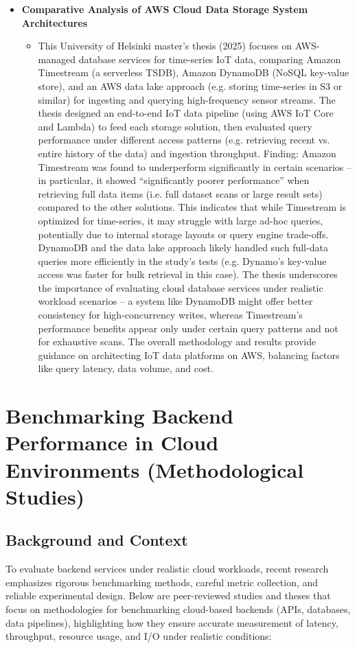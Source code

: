 \documentclass[11pt]{article}
\begin{document}
\begin{itemize}
\begin{itemize}
    \end{itemize}
    \item[] \textbf{Comparative Analysis of AWS Cloud Data Storage System Architectures} 
    \begin{itemize}
        \item[]  This University of Helsinki master’s thesis (2025) focuses on AWS-managed database services for time-series IoT data, comparing Amazon Timestream (a serverless TSDB), Amazon DynamoDB (NoSQL key-value store), and an AWS data lake approach (e.g. storing time-series in S3 or similar) for ingesting and querying high-frequency sensor streams. The thesis designed an end-to-end IoT data pipeline (using AWS IoT Core and Lambda) to feed each storage solution, then evaluated query performance under different access patterns (e.g. retrieving recent vs. entire history of the data) and ingestion throughput. Finding: Amazon Timestream was found to underperform significantly in certain scenarios – in particular, it showed “significantly poorer performance” when retrieving full data items (i.e. full dataset scans or large result sets) compared to the other solutions. This indicates that while Timestream is optimized for time-series, it may struggle with large ad-hoc queries, potentially due to internal storage layouts or query engine trade-offs. DynamoDB and the data lake approach likely handled such full-data queries more efficiently in the study’s tests (e.g. Dynamo’s key-value access was faster for bulk retrieval in this case). The thesis underscores the importance of evaluating cloud database services under realistic workload scenarios – a system like DynamoDB might offer better consistency for high-concurrency writes, whereas Timestream’s performance benefits appear only under certain query patterns and not for exhaustive scans. The overall methodology and results provide guidance on architecting IoT data platforms on AWS, balancing factors like query latency, data volume, and cost.
    \end{itemize}
\end{itemize}

\section*{Benchmarking Backend Performance in Cloud Environments (Methodological Studies)}

\subsection*{Background and Context}
To evaluate backend services under realistic cloud workloads, recent research emphasizes rigorous benchmarking methods, careful metric collection, and reliable experimental design. Below are peer-reviewed studies and theses that focus on methodologies for benchmarking cloud-based backends (APIs, databases, data pipelines), highlighting how they ensure accurate measurement of latency, throughput, resource usage, and I/O under realistic conditions:
\end{document}
